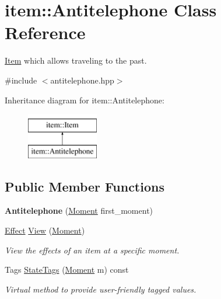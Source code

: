 \hypertarget{classitem_1_1_antitelephone}{}\section{item\+:\+:Antitelephone Class Reference}
\label{classitem_1_1_antitelephone}


\hyperlink{classitem_1_1_item}{Item} which allows traveling to the past.  




{\ttfamily \#include $<$antitelephone.\+hpp$>$}

Inheritance diagram for item\+:\+:Antitelephone\+:\begin{figure}[H]
\begin{center}
\leavevmode
\includegraphics[height=2.000000cm]{classitem_1_1_antitelephone}
\end{center}
\end{figure}
\subsection*{Public Member Functions}
\begin{DoxyCompactItemize}
\item 
\mbox{\label{classitem_1_1_antitelephone_a832d79223e555ae7dd69d11377392731}} 
{\bfseries Antitelephone} (\hyperlink{classtimeplane_1_1_moment}{Moment} first\+\_\+moment)
\item 
\hyperlink{classitem_1_1_effect}{Effect} \hyperlink{classitem_1_1_antitelephone_aa44819e9242edbdfdfc4f14b5d2b34ec}{View} (\hyperlink{classtimeplane_1_1_moment}{Moment})
\begin{DoxyCompactList}\small\item\em View the effects of an item at a specific moment. \end{DoxyCompactList}\item 
Tags \hyperlink{classitem_1_1_antitelephone_a0322847417981b9acd4b323c35e728f0}{State\+Tags} (\hyperlink{classtimeplane_1_1_moment}{Moment} m) const
\begin{DoxyCompactList}\small\item\em Virtual method to provide user-\/friendly tagged values. \end{DoxyCompactList}\end{DoxyCompactItemize}
